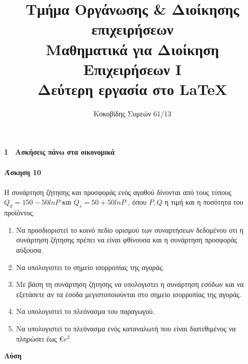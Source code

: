\documentclass[12pt,a4paper]{article}
\author{Κοκοβίδης Συμεών 61/13}
\title{ Τμήμα Οργάνωσης \& Διοίκησης επιχειρήσεων \\ Μαθηματικά για Διοίκηση Επιχειρήσεων Ι \\ Δεύτερη εργασία στο \LaTeX}
\begin{document}
\maketitle 
\textbf{{\Large 1 \ Ασκήσεις πάνω στα οικονομικά}}\\\\
\textbf{Άσκηση 10}\\\\

Η συνάρτηση ζήτησης και προσφοράς ενός αγαθού δίνονται από τους τύπους $Q_d = 150-50lnP$ και $Q_s = 50+ 50lnP$ , όπου $P, Q$ η τιμή και η ποσότητα του προϊόντος.\\

\begin{enumerate}
\item Να προσδιοριστεί το κοινό πεδίο ορισμού των συναρτήσεων δεδομένου οτι η συνάρτηση ζήτησης πρέπει να είναι φθίνουσα και η συνάρτηση προσφοράς αύξουσα.\\
\item Να υπολογιστει το σημείο ισορροπίας της αγοράς.\\
\item Με βάση τη συνάρτηση ζήτησης να υπολογιστει η συνάρτηση εσόδων και να εξετάσετε αν τα έσοδα μεγιστοποιούνται στο σημείο ισορροπίας της αγοράς.\\
\item Να υπολογιστεί το πλεόνασμα του παραγωγού.\\
\item Να υπολογιστεί το πλεόνασμα ενός καταναλωτή που είναι διατεθιμένος να πληρώσει έως \euro $e^2$\\
\end{enumerate} 
\textbf{Λύση}\\
\end{document}
